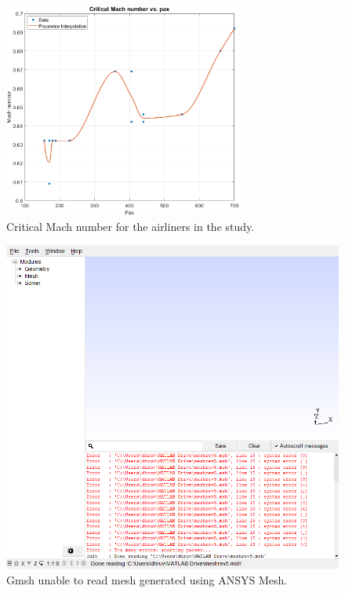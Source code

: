 \documentclass[english]{kththesis}
\begin{document}
\begin{figure}[!ht]
    \centering
    \includegraphics[width=0.7\textwidth]{Epictures/McritvsPax.png}
    \caption{Critical Mach number for the airliners in the study.}
    \label{fig:McritPax}
\end{figure}

\begin{figure}[!htb]
    \centering
    \includegraphics[width=1\textwidth]{IPS/cant read ansys mesh.png}
    \caption{Gmsh unable to read mesh generated using ANSYS Mesh.}
    \label{fig:gmsh_error_ansys}
\end{figure}
\end{document}
